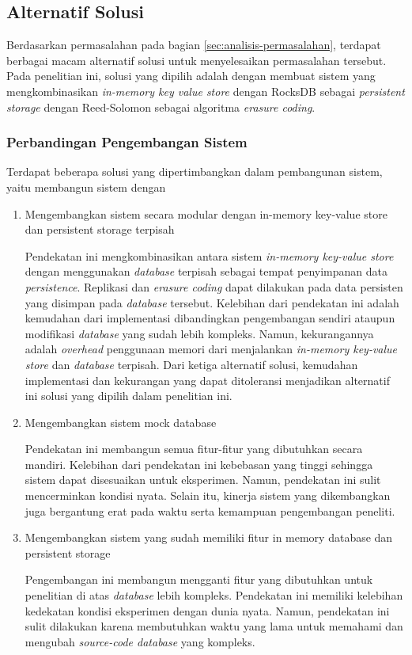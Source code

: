 \subsection{Alternatif Solusi}
\label{sec:alternatif-solusi}

Berdasarkan permasalahan pada bagian \ref{sec:analisis-permasalahan}, terdapat berbagai macam alternatif solusi untuk menyelesaikan permasalahan tersebut. Pada penelitian ini, solusi yang dipilih adalah dengan membuat sistem yang mengkombinasikan \textit{in-memory key value store} dengan RocksDB sebagai \textit{persistent storage} dengan Reed-Solomon sebagai algoritma \textit{erasure coding}.

\subsubsection{Perbandingan Pengembangan Sistem}

Terdapat beberapa solusi yang dipertimbangkan dalam pembangunan sistem, yaitu membangun sistem dengan 

\begin{enumerate}
  \item Mengembangkan sistem secara modular dengan in-memory key-value store dan persistent storage terpisah
  
  Pendekatan ini mengkombinasikan antara sistem \textit{in-memory key-value store} dengan menggunakan \textit{database} terpisah sebagai tempat penyimpanan data \textit{persistence}. Replikasi dan \textit{erasure coding} dapat dilakukan pada data persisten yang disimpan pada \textit{database} tersebut. Kelebihan dari pendekatan ini adalah kemudahan dari implementasi dibandingkan pengembangan sendiri ataupun modifikasi \textit{database} yang sudah lebih kompleks. Namun, kekurangannya adalah \textit{overhead} penggunaan memori dari menjalankan \textit{in-memory key-value store} dan \textit{database} terpisah. Dari ketiga alternatif solusi, kemudahan implementasi dan kekurangan yang dapat ditoleransi menjadikan alternatif ini solusi yang dipilih dalam penelitian ini.


  \item Mengembangkan sistem mock database
  
  Pendekatan ini membangun semua fitur-fitur yang dibutuhkan secara mandiri. Kelebihan dari pendekatan ini kebebasan yang tinggi sehingga sistem dapat disesuaikan untuk eksperimen. Namun, pendekatan ini sulit mencerminkan kondisi nyata. Selain itu, kinerja sistem yang dikembangkan juga bergantung erat pada waktu serta kemampuan pengembangan peneliti.

  \item Mengembangkan sistem yang sudah memiliki fitur in memory database dan persistent storage
  
  Pengembangan ini membangun mengganti fitur yang dibutuhkan untuk penelitian di atas \textit{database} lebih kompleks. Pendekatan ini memiliki kelebihan kedekatan kondisi eksperimen dengan dunia nyata. Namun, pendekatan ini sulit dilakukan karena membutuhkan waktu yang lama untuk memahami dan mengubah \textit{source-code database} yang kompleks.
\end{enumerate}

